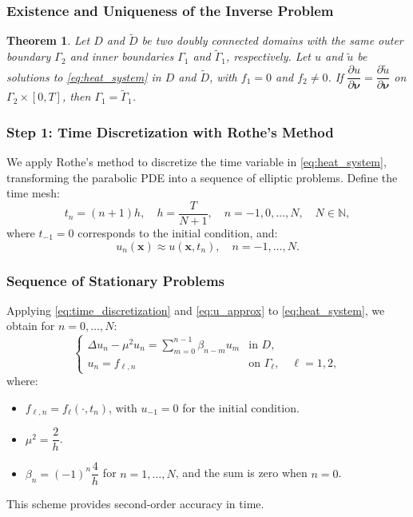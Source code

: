 \documentclass{beamer}
\newtheorem{theorem}{Theorem} %
\newcommand{\bvec}[1]{\boldsymbol{#1}} %
\begin{document}
\begin{frame}
    \frametitle{Existence and Uniqueness of the Inverse Problem}
    \begin{theorem}
        Let \( D \) and \( \tilde{D} \) be two doubly connected domains with the same outer boundary \( \Gamma_2 \) and inner boundaries \( \Gamma_1 \) and \( \tilde{\Gamma}_1 \), respectively. Let \( u \) and \( \tilde{u} \) be solutions to \eqref{eq:heat_system} in \( D \) and \( \tilde{D} \), with \( f_1 = 0 \) and \( f_2 \neq 0 \). If \( \dfrac{\partial u}{\partial \bvec{\nu}} = \dfrac{\partial \tilde{u}}{\partial \bvec{\nu}} \) on \( \Gamma_2 \times [0, T] \), then \( \Gamma_1 = \tilde{\Gamma}_1 \).
    \end{theorem}
\end{frame}

\begin{frame}
    \frametitle{Step 1: Time Discretization with Rothe's Method}
    We apply Rothe's method to discretize the time variable in \eqref{eq:heat_system}, transforming the parabolic PDE into a sequence of elliptic problems. Define the time mesh:
    \begin{equation}\label{eq:time_discretization}
        t_n = (n + 1) h, \quad h = \dfrac{T}{N + 1}, \quad n = -1, 0, \ldots, N, \quad N \in \mathbb{N},
    \end{equation}
    where \( t_{-1} = 0 \) corresponds to the initial condition, and:
    \begin{equation}\label{eq:u_approx}
        u_n(\bvec{x}) \approx u(\bvec{x}, t_n), \quad n = -1, \ldots, N.
    \end{equation}
\end{frame}

\begin{frame}
    \frametitle{Sequence of Stationary Problems}
    Applying \eqref{eq:time_discretization} and \eqref{eq:u_approx} to \eqref{eq:heat_system}, we obtain for \( n = 0, \ldots, N \):
    \begin{equation}
        \begin{cases}
            \Delta u_n - \mu^2 u_n = \sum_{m=0}^{n-1} \beta_{n-m} u_m & \text{in } D, \\
            u_n = f_{\ell, n} & \text{on } \Gamma_\ell, \quad \ell = 1, 2,
        \end{cases}
    \end{equation}
    where:
    \begin{itemize}
        \item \( f_{\ell, n} = f_\ell(\cdot, t_n) \), with \( u_{-1} = 0 \) for the initial condition.
        \item \( \mu^2 = \dfrac{2}{h} \).
        \item \( \beta_n = (-1)^n \dfrac{4}{h} \) for \( n = 1, \ldots, N \), and the sum is zero when \( n = 0 \).
    \end{itemize}
    This scheme provides second-order accuracy in time.
\end{frame}
\end{document}
